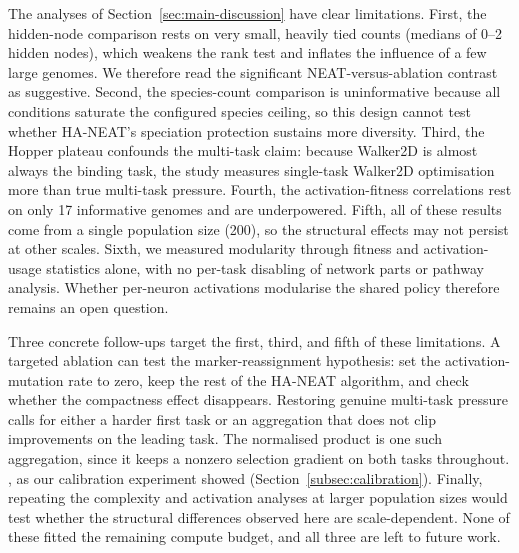 The analyses of Section~\ref{sec:main-discussion} have clear limitations.
First, the hidden-node comparison rests on very small, heavily tied counts (medians of 0--2 hidden nodes), which weakens the rank test and inflates the influence of a few large genomes. We therefore read the significant NEAT-versus-ablation contrast as suggestive.
Second, the species-count comparison is uninformative because all conditions saturate the configured species ceiling, so this design cannot test whether HA-NEAT's speciation protection sustains more diversity.
Third, the Hopper plateau confounds the multi-task claim: because Walker2D is almost always the binding task, the study measures single-task Walker2D optimisation more than true multi-task pressure.
Fourth, the activation-fitness correlations rest on only 17 informative genomes and are underpowered.
Fifth, all of these results come from a single population size (200), so the structural effects may not persist at other scales.
Sixth, we measured modularity through fitness and activation-usage statistics alone, with no per-task disabling of network parts or pathway analysis. Whether per-neuron activations modularise the shared policy therefore remains an open question.

Three concrete follow-ups target the first, third, and fifth of these limitations.
A targeted ablation can test the marker-reassignment hypothesis: set the activation-mutation rate to zero, keep the rest of the HA-NEAT algorithm, and check whether the compactness effect disappears.
Restoring genuine multi-task pressure calls for either a harder first task or an aggregation that does not clip improvements on the leading task. The normalised product is one such aggregation, since it keeps a nonzero selection gradient on both tasks throughout. , as our calibration experiment showed (Section~\ref{subsec:calibration}).
Finally, repeating the complexity and activation analyses at larger population sizes would test whether the structural differences observed here are scale-dependent.
None of these fitted the remaining compute budget, and all three are left to future work.


